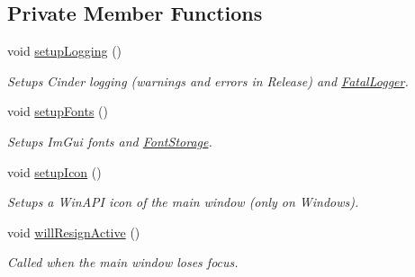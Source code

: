 \subsection*{Private Member Functions}
\begin{DoxyCompactItemize}
\item 
\mbox{\label{classpepr3d_1_1_main_application_ab109e61da72a727f217fa9e715642c42}} 
void \mbox{\hyperlink{classpepr3d_1_1_main_application_ab109e61da72a727f217fa9e715642c42}{setup\+Logging}} ()
\begin{DoxyCompactList}\small\item\em Setups Cinder logging (warnings and errors in Release) and \mbox{\hyperlink{classpepr3d_1_1_fatal_logger}{Fatal\+Logger}}. \end{DoxyCompactList}\item 
\mbox{\label{classpepr3d_1_1_main_application_a2e368d949ee47ce6466d2abd992e9e9f}} 
void \mbox{\hyperlink{classpepr3d_1_1_main_application_a2e368d949ee47ce6466d2abd992e9e9f}{setup\+Fonts}} ()
\begin{DoxyCompactList}\small\item\em Setups Im\+Gui fonts and \mbox{\hyperlink{classpepr3d_1_1_font_storage}{Font\+Storage}}. \end{DoxyCompactList}\item 
\mbox{\label{classpepr3d_1_1_main_application_ac2ab8320c6d5bc477b5b44a518e32dbd}} 
void \mbox{\hyperlink{classpepr3d_1_1_main_application_ac2ab8320c6d5bc477b5b44a518e32dbd}{setup\+Icon}} ()
\begin{DoxyCompactList}\small\item\em Setups a Win\+A\+PI icon of the main window (only on Windows). \end{DoxyCompactList}\item 
\mbox{\label{classpepr3d_1_1_main_application_a3b26419f0dc484c466b4b65686cb09d5}} 
void \mbox{\hyperlink{classpepr3d_1_1_main_application_a3b26419f0dc484c466b4b65686cb09d5}{will\+Resign\+Active}} ()
\begin{DoxyCompactList}\small\item\em Called when the main window loses focus. \end{DoxyCompactList}\item 

\end{DoxyCompactItemize}
